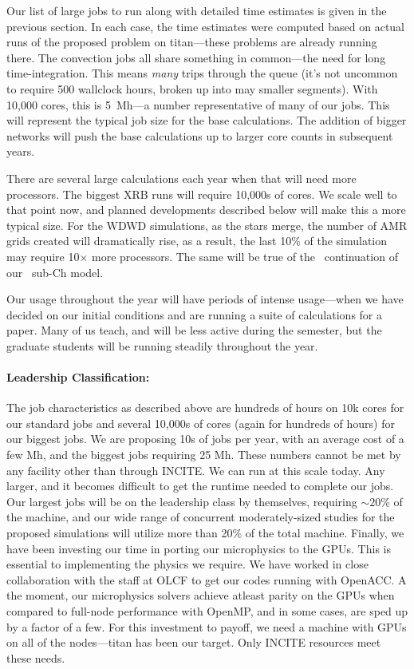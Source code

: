 Our list of large jobs to run along with detailed time estimates is
given in the previous section.  In each case, the time estimates were
computed based on actual runs of the proposed problem on titan---these
problems are already running there.  The convection jobs all share
something in common---the need for long time-integration.  This means
{\em many} trips through the queue (it's not uncommon to require 500
wallclock hours, broken up into may smaller segments).  With 10,000
cores, this is 5~Mh---a number representative of many of our jobs.
This will represent the typical job size for the base calculations.
The addition of bigger networks will push the base calculations up to
larger core counts in subsequent years.

There are several large calculations each year when that will need more
processors.  The biggest XRB runs will require 10,000s of cores.  We
scale well to that point now, and planned developments described
below will make this a more typical size.  For the WDWD simulations,
as the stars merge, the number of AMR grids created will dramatically
rise, as a result, the last 10\% of the simulation may require
10$\times$ more processors.  The same will be true of the
\castro\ continuation of our \maestro\ sub-Ch model.

Our usage throughout the year will have periods of intense
usage---when we have decided on our initial conditions and are running
a suite of calculations for a paper.  Many of us teach, and will be
less active during the semester, but the graduate students will be running
steadily throughout the year.


\paragraph{Leadership Classification: }
%
The job characteristics as described above are hundreds of hours on
10k cores for our standard jobs and several 10,000s of cores (again
for hundreds of hours) for our biggest jobs.  We are proposing 10s of
jobs per year, with an average cost of a few Mh, and the biggest jobs
requiring 25 Mh.  These numbers cannot be met by any facility other
than through INCITE.  We can run at this scale today.  Any larger, and
it becomes difficult to get the runtime needed to complete our jobs.
Our largest jobs will be on the leadership class by themselves,
requiring $\sim 20$\% of the machine, and our wide range of concurrent
moderately-sized studies for the proposed simulations will utilize
more than 20\% of the total machine.  Finally, we have been investing
our time in porting our microphysics to the GPUs.  This is essential
to implementing the physics we require.  We have worked in close
collaboration with the staff at OLCF to get our codes running with
OpenACC.  A the moment, our microphysics solvers achieve atleast
parity on the GPUs when compared to full-node performance with OpenMP,
and in some cases, are sped up by a factor of a few.  For this
investment to payoff, we need a machine with GPUs on all of the
nodes---titan has been our target.  Only INCITE resources meet these
needs.

